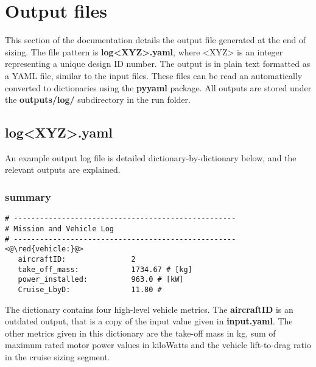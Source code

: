 \section{Output files}
This section of the documentation details the output file generated at the end of sizing. The file pattern is \textbf{log<XYZ>.yaml}, where <XYZ> is an integer representing a unique design ID number. The output is in plain text formatted as a YAML file, similar to the input files. These files can be read an automatically converted to \python \spc dictionaries using the \textbf{pyyaml} package. All outputs are stored under the \textbf{outputs/log/} subdirectory in the run folder.

\subsection{\textbf{log<XYZ>.yaml}}
An example output log file is detailed dictionary-by-dictionary below, and the relevant outputs are explained. 

\subsubsection{ summary}
\begin{lstlisting}
# ---------------------------------------------------
# Mission and Vehicle Log
# ---------------------------------------------------
<@\red{vehicle:}@>
   aircraftID:               2 
   take_off_mass:            1734.67 # [kg]
   power_installed:          963.0 # [kW]
   Cruise_LbyD:              11.80 # 
\end{lstlisting}
The  dictionary contains four high-level vehicle metrics. The \textbf{aircraftID} is an outdated output, that is a copy of the input value given in \textbf{input.yaml}. The other metrics given in this dictionary are the take-off mass in kg, sum of maximum rated motor power values in kiloWatts and the vehicle lift-to-drag ratio in the cruise sizing segment. 

